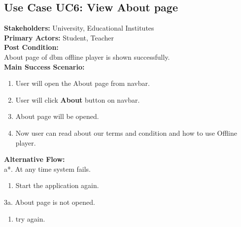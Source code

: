 \subsection{Use Case UC6: View About page}
\textbf{Stakeholders: } University, Educational Institutes \\
\textbf{Primary Actors: } Student, Teacher \\
\textbf{Post Condition: }\\
About page of dbm offline player is shown successfully.\\
\textbf{Main Success Scenario: }
\begin{enumerate}
\item User will open the About page from navbar.
\item User will click \textbf{About} button on navbar.
\item About page will be opened.
\item Now user can read about our terms and condition and how to use Offline player.

\end{enumerate}
\textbf{Alternative Flow: }\\
a*. At any time system fails.
\begin{enumerate}
\item Start the application again.
\end{enumerate}
3a. About page is not opened.
\begin{enumerate}
\item try again.
\end{enumerate}




